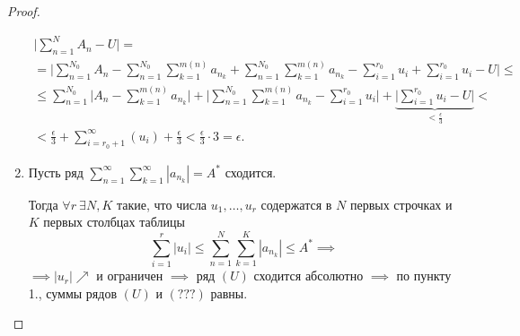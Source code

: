 \documentclass{report}
\theoremstyle{definition}
\begin{document}
\begin{proof}
\begin{enumerate}
          \begin{multline*}
            \bigg|\sum_{n=1}^{N}A_n - U\bigg| = \\
            = \bigg|\sum_{n=1}^{N_0}A_n - \sum_{n=1}^{N_0}\sum_{k=1}^{m(n)}a_{n_k} + \sum_{n=1}^{N_0}\sum_{k=1}^{m(n)}a_{n_k} - \sum_{i=1}^{r_0}u_i + \sum_{i=1}^{r_0}u_i - U\bigg| \leqslant \\
            \leqslant \sum_{n=1}^{N_0}\bigg|A_n - \sum_{k=1}^{m(n)}a_{n_k}\bigg| + \bigg|\sum_{n=1}^{N_0}\sum_{k=1}^{m(n)}a_{n_k} - \sum_{i=1}^{r_0}u_i\bigg| + \underbrace{\bigg|\sum_{i=1}^{r_0}u_i - U\bigg|}_{<\frac{\epsilon}{3}} < \\
            < \frac{\epsilon}{3} + \sum_{i=r_0 + 1}^{\infty}(u_i) + \frac{\epsilon}{3} < \frac{\epsilon}{3} \cdot 3 = \epsilon.
          \end{multline*}

    \item Пусть ряд $\sum_{n=1}^{\infty}\sum_{k=1}^{\infty}|a_{n_k}| = A^*$ сходится.

          Тогда $\forall r \ \exists N,K$ такие, что числа $u_1,\ldots,u_r$ содержатся в $N$ первых строчках и $K$ первых столбцах таблицы
          \begin{equation*}
            \sum_{i=1}^{r}|u_i| \leqslant \sum_{n=1}^{N}\sum_{k=1}^{K}|a_{n_k}| \leqslant A^* \implies
          \end{equation*}
          $\implies |u_r|\nearrow$ и ограничен $\implies$ ряд $(U)$ сходится абсолютно $\implies$ по пункту 1., суммы рядов $(U)$ и $(???)$ равны.
  \end{enumerate}
\end{proof}
\end{document}
